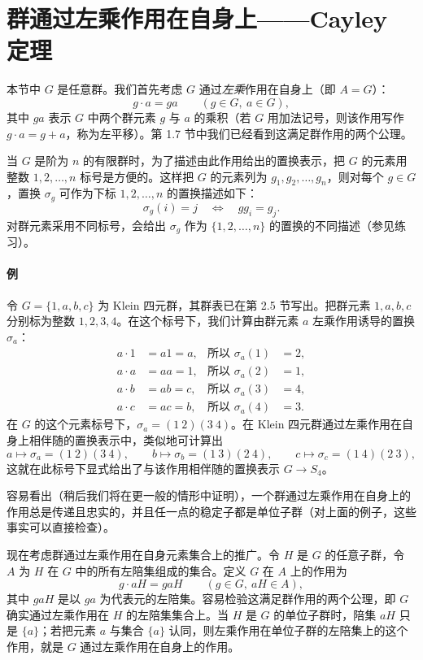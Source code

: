 \section{群通过左乘作用在自身上——Cayley 定理}

本节中 $G$ 是任意群。我们首先考虑 $G$ 通过\emph{左乘}作用在自身上（即 $A=G$）：
\[
  g\cdot a=ga\qquad (g\in G,\ a\in G),
\]
其中 $ga$ 表示 $G$ 中两个群元素 $g$ 与 $a$ 的乘积（若 $G$ 用加法记号，则该作用写作 $g\cdot a=g+a$，称为左平移）。第 1.7 节中我们已经看到这满足群作用的两个公理。

当 $G$ 是阶为 $n$ 的有限群时，为了描述由此作用给出的置换表示，把 $G$ 的元素用整数 $1,2,\ldots,n$ 标号是方便的。这样把 $G$ 的元素列为 $g_1,g_2,\ldots,g_n$，则对每个 $g\in G$，置换 $\sigma_g$ 可作为下标 $1,2,\ldots,n$ 的置换描述如下：
\[
  \sigma_g(i)=j\quad\Longleftrightarrow\quad gg_i=g_j.
\]
对群元素采用不同标号，会给出 $\sigma_g$ 作为 $\{1,2,\ldots,n\}$ 的置换的不同描述（参见练习）。

\paragraph{例}
令 $G=\{1,a,b,c\}$ 为 Klein 四元群，其群表已在第 2.5 节写出。把群元素 $1,a,b,c$ 分别标为整数 $1,2,3,4$。在这个标号下，我们计算由群元素 $a$ 左乘作用诱导的置换 $\sigma_a$：
\begin{align*}
  a\cdot1&=a1=a,       &\text{所以 }\sigma_a(1)&=2,\\
  a\cdot a&=aa=1,      &\text{所以 }\sigma_a(2)&=1,\\
  a\cdot b&=ab=c,      &\text{所以 }\sigma_a(3)&=4,\\
  a\cdot c&=ac=b,      &\text{所以 }\sigma_a(4)&=3.
\end{align*}
在 $G$ 的这个元素标号下，$\sigma_a=(1\ 2)(3\ 4)$。在 Klein 四元群通过左乘作用在自身上相伴随的置换表示中，类似地可计算出
\[
  a\longmapsto \sigma_a=(1\ 2)(3\ 4),\qquad
  b\longmapsto \sigma_b=(1\ 3)(2\ 4),\qquad
  c\longmapsto \sigma_c=(1\ 4)(2\ 3),
\]
这就在此标号下显式给出了与该作用相伴随的置换表示 $G\to S_4$。

容易看出（稍后我们将在更一般的情形中证明），一个群通过左乘作用在自身上的作用总是传递且忠实的，并且任一点的稳定子都是单位子群（对上面的例子，这些事实可以直接检查）。

现在考虑群通过左乘作用在自身元素集合上的推广。令 $H$ 是 $G$ 的任意子群，令 $A$ 为 $H$ 在 $G$ 中的所有左陪集组成的集合。定义 $G$ 在 $A$ 上的作用为
\[
  g\cdot aH=gaH\qquad (g\in G,
\ aH\in A),
\]
其中 $gaH$ 是以 $ga$ 为代表元的左陪集。容易检验这满足群作用的两个公理，即 $G$ 确实通过左乘作用在 $H$ 的左陪集集合上。当 $H$ 是 $G$ 的单位子群时，陪集 $aH$ 只是 $\{a\}$；若把元素 $a$ 与集合 $\{a\}$ 认同，则左乘作用在单位子群的左陪集上的这个作用，就是 $G$ 通过左乘作用在自身上的作用。

